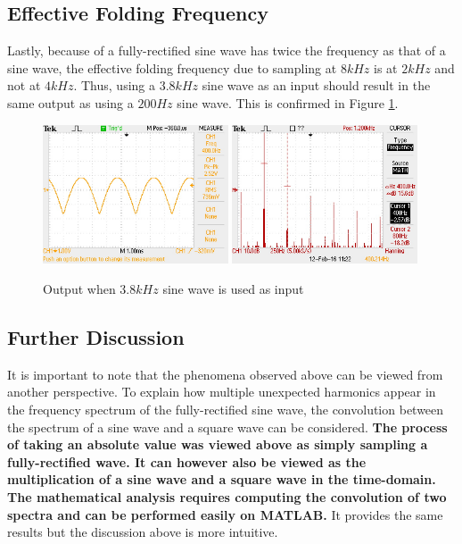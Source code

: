 \documentclass{article}
\begin{document}
\subsection{Effective Folding Frequency}

Lastly, because of a fully-rectified sine wave has twice the frequency as that of a sine wave, the effective folding frequency due to sampling at $8kHz$ is at $2kHz$ and not at $4kHz$. Thus, using a $3.8kHz$ sine wave as an input should result in the same output as using a $200Hz$ sine wave. This is confirmed in Figure \ref{fig:3800Hz_input}.

\begin{figure}[H]
    \centering
    \includegraphics[width=0.49\textwidth]{ex1_3800Hz_input}
    \includegraphics[width=0.49\textwidth]{ex1_3800Hz_input_FFT}
    \caption{Output when $3.8kHz$ sine wave is used as input}
    \label{fig:3800Hz_input}
\end{figure}

\subsection{Further Discussion}
It is important to note that the phenomena observed above can be viewed from another perspective. To explain how multiple unexpected harmonics appear in the frequency spectrum of the fully-rectified sine wave, the convolution between the spectrum of a sine wave and a square wave can be considered. \textbf{The process of taking an absolute value was viewed above as simply sampling a fully-rectified wave. It can however also be viewed as the multiplication of a sine wave and a square wave in the time-domain. The mathematical analysis requires computing the convolution of two spectra and can be performed easily on MATLAB.} It provides the same results but the discussion above is more intuitive. \\
\end{document}
